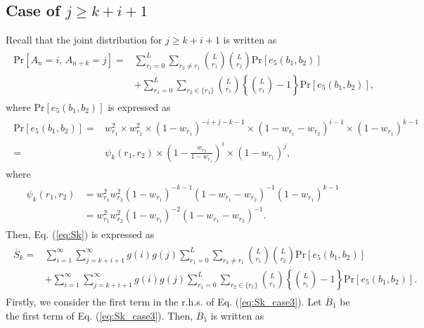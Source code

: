 \documentclass[dvipdfmx,english]{ampmt} %
\begin{document}
\subsection{Case of $j \geq k+i+1$}
Recall that the joint distribution for $j \geq k+i+1$ is written as
\begin{align}\begin{split}
  \mathrm{Pr}[A_n=i,\, A_{n+k}=j] 
  =& \sum_{r_1=0}^{L} \sum_{r_2 \neq r_1} \binom{L}{r_1}\binom{L}{r_2}\mathrm{Pr}[e_5(b_1,b_2)] \\
  &+ \sum_{r_1=0}^{L} \sum_{r_2 \in \{r_1\}} \binom{L}{r_1}\left\{\binom{L}{r_1}-1\right\}\mathrm{Pr}[e_5(b_1,b_2)],
\end{split}\end{align}
where $\mathrm{Pr}[e_5(b_1,b_2)]$ is expressed as
\begin{align}\begin{split}
  \mathrm{Pr}[e_5(b_1,b_2)]
  =& w_{r_1}^2  \times w_{r_2}^2 
  \times (1-w_{r_1})^{-i+j-k-1} 
  \times (1-w_{r_1}-w_{r_2})^{i-1}
  \times (1-w_{r_1})^{k-1} \\
  =&\psi_k(r_1,r_2)\times \left(1-\frac{w_{r_2}}{1-w_{r_1}} \right)^{i} \times (1-w_{r_1})^j,
\end{split}\end{align}
%
where
\begin{align}\begin{split}
  \psi_k(r_1,r_2) 
  &= w_{r_1}^2 w_{r_2}^2 
    (1-w_{r_1})^{-k-1} 
    (1-w_{r_1}-w_{r_2})^{-1}
    (1-w_{r_1})^{k-1} \\
  &= w_{r_1}^2 w_{r_2}^2 (1-w_{r_1})^{-2} (1-w_{r_1}-w_{r_2})^{-1}.
  \label{eq:psi_k}
\end{split}\end{align}
%
Then, Eq. (\ref{eq:Sk}) is expressed as
\begin{align}\begin{split}\label{eq:Sk_case5}
  \overline{S}_k 
  =& \sum_{i=1}^{\infty}\sum_{j=k+i+1}^{\infty} g(i)g(j) \sum_{r_1=0}^{L} \sum_{r_2 \neq r_1} \binom{L}{r_1}\binom{L}{r_2}\mathrm{Pr}[e_5(b_1,b_2)]\\ 
  &+ \sum_{i=1}^{\infty}\sum_{j=k+i+1}^{\infty} g(i)g(j) \sum_{r_1=0}^{L} \sum_{r_2 \in \{r_1\}} \binom{L}{r_1} \left\{\binom{L}{r_1}-1 \right\}\mathrm{Pr}[e_5(b_1,b_2)].
\end{split}\end{align}
%
Firstly, we consider the first term in the r.h.s. of Eq. (\ref{eq:Sk_case3}). Let $\overline{B}_1$ be the first term of Eq. (\ref{eq:Sk_case3}). Then, $\overline{B}_1$ is written as
\end{document}
